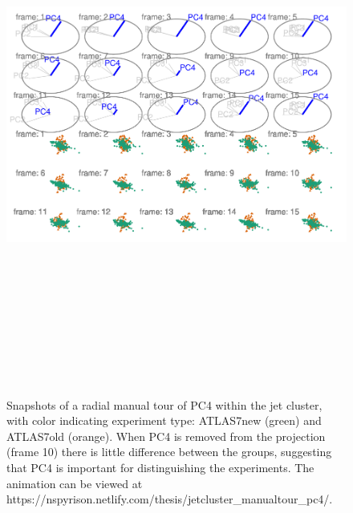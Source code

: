 \begin{Schunk}
\begin{figure}

{\centering \includegraphics[width=5.83in,height=7in]{spyrison-cook_files/figure-latex/JetClusterGood-1} 

}

\caption[Snapshots of a radial manual tour of PC4 within the jet cluster, with color indicating experiment type]{Snapshots of a radial manual tour of PC4 within the jet cluster, with color indicating experiment type: ATLAS7new (green) and ATLAS7old (orange). When PC4 is removed from the projection (frame 10) there is little difference between the groups, suggesting that PC4 is important for distinguishing the experiments. The animation can be viewed at https://nspyrison.netlify.com/thesis/jetcluster\_manualtour\_pc4/.}\label{fig:JetClusterGood}
\end{figure}
\end{Schunk}

